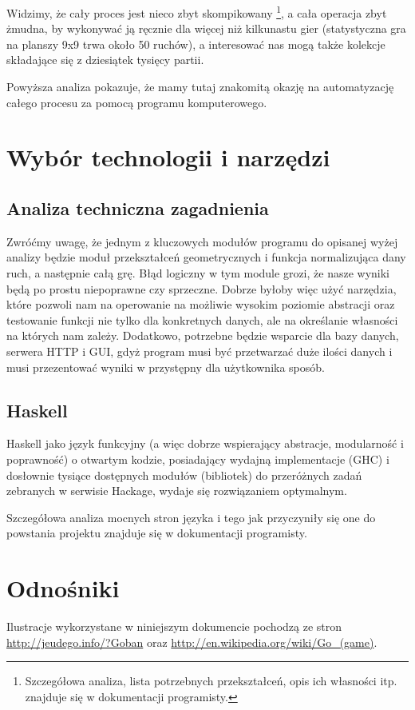 \documentclass[11pt,leqno]{article}
\begin{document}
Widzimy, że cały proces jest nieco zbyt skompikowany \footnote{Szczegółowa analiza, lista potrzebnych przekształceń, 
opis ich własności itp. znajduje się w dokumentacji programisty.}, a cała operacja zbyt żmudna, by wykonywać ją ręcznie dla więcej niż 
kilkunastu gier (statystyczna gra na planszy 9x9 trwa około 50 ruchów), a interesować nas mogą także kolekcje składające się
 z dziesiątek tysięcy partii.

Powyższa analiza pokazuje, że mamy tutaj znakomitą okazję na automatyzację całego procesu za pomocą programu komputerowego. 

\section{Wybór technologii i narzędzi}

\subsection{Analiza techniczna zagadnienia}
Zwróćmy uwagę, że jednym z kluczowych modułów programu do opisanej wyżej analizy będzie moduł przekształceń geometrycznych i
 funkcja normalizująca dany ruch, a następnie całą grę. Błąd logiczny w tym module grozi, że nasze wyniki będą po prostu 
niepoprawne czy sprzeczne. Dobrze byłoby więc użyć narzędzia, które pozwoli nam na operowanie na możliwie wysokim poziomie
 abstracji oraz testowanie funkcji nie tylko dla konkretnych danych, ale na określanie własności na których nam zależy. 
Dodatkowo, potrzebne będzie wsparcie dla bazy danych, serwera HTTP i GUI, gdyż program musi być przetwarzać duże ilości danych
 i musi przezentować wyniki w przystępny dla użytkownika sposób. 

\subsection{Haskell}
Haskell jako język funkcyjny (a więc dobrze wspierający abstracje,
 modularność i poprawność) o otwartym kodzie, posiadający wydajną implementacje (GHC) i dosłownie tysiące dostępnych modułów
 (bibliotek) do przeróżnych zadań zebranych w serwisie Hackage, wydaje się rozwiązaniem optymalnym.

Szczegółowa analiza mocnych stron języka i tego jak przyczyniły się one do powstania projektu znajduje się w dokumentacji programisty.

\section{Odnośniki}
Ilustracje wykorzystane w niniejszym dokumencie pochodzą ze stron \url{http://jeudego.info/?Goban} oraz 
\url{http://en.wikipedia.org/wiki/Go\_(game)}.
\end{document}

